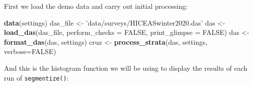 \documentclass[
]{book}
\newenvironment{Shaded}{\begin{snugshade}}{\end{snugshade}}
\newcommand{\DataTypeTok}[1]{\textcolor[rgb]{0.13,0.29,0.53}{#1}}
\newcommand{\KeywordTok}[1]{\textcolor[rgb]{0.13,0.29,0.53}{\textbf{#1}}}
\newcommand{\NormalTok}[1]{#1}
\newcommand{\OtherTok}[1]{\textcolor[rgb]{0.56,0.35,0.01}{#1}}
\newcommand{\StringTok}[1]{\textcolor[rgb]{0.31,0.60,0.02}{#1}}
\begin{document}
First we load the demo data and carry out initial processing:

\begin{Shaded}
\begin{Highlighting}[]
\KeywordTok{data}\NormalTok{(settings)}
\NormalTok{das_file <-}\StringTok{ 'data/surveys/HICEASwinter2020.das'}
\NormalTok{das <-}\StringTok{ }\KeywordTok{load_das}\NormalTok{(das_file, }
                \DataTypeTok{perform_checks =} \OtherTok{FALSE}\NormalTok{,}
                \DataTypeTok{print_glimpse =} \OtherTok{FALSE}\NormalTok{)}
\NormalTok{das <-}\StringTok{ }\KeywordTok{format_das}\NormalTok{(das, settings)}
\NormalTok{cruz <-}\StringTok{ }\KeywordTok{process_strata}\NormalTok{(das,}
\NormalTok{                       settings,}
                       \DataTypeTok{verbose=}\OtherTok{FALSE}\NormalTok{)}
\end{Highlighting}
\end{Shaded}

And this is the histogram function we will be using to display the results of each run of \texttt{segmentize()}:
\end{document}
